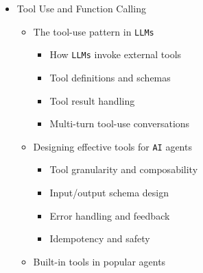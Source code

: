 \documentclass[
]{article}
\providecommand{\tightlist}{%
  \setlength{\itemsep}{0pt}\setlength{\parskip}{0pt}}
\begin{document}
\begin{itemize}
\begin{itemize}
    \begin{itemize}
    \tightlist
    \item
      Searching by pattern and semantic meaning
    \item
      Understanding call graphs and dependencies
    \item
      Tracing data flow across modules
    \end{itemize}
  \item
    Refactoring monoliths with \texttt{AI} assistance

    \begin{itemize}
    \tightlist
    \item
      Identifying extraction candidates
    \item
      Safe, incremental refactoring workflows
    \item
      Maintaining test coverage during refactoring
    \end{itemize}
  \item
    \texttt{AI}-assisted code archaeology

    \begin{itemize}
    \tightlist
    \item
      Understanding legacy code
    \item
      Documenting tribal knowledge
    \item
      Mapping undocumented APIs and protocols
    \end{itemize}
  \end{itemize}
\item
  Tool Use and Function Calling

  \begin{itemize}
  \tightlist
  \item
    The tool-use pattern in \texttt{LLMs}

    \begin{itemize}
    \tightlist
    \item
      How \texttt{LLMs} invoke external tools
    \item
      Tool definitions and schemas
    \item
      Tool result handling
    \item
      Multi-turn tool-use conversations
    \end{itemize}
  \item
    Designing effective tools for \texttt{AI} agents

    \begin{itemize}
    \tightlist
    \item
      Tool granularity and composability
    \item
      Input/output schema design
    \item
      Error handling and feedback
    \item
      Idempotency and safety
    \end{itemize}
  \item
    Built-in tools in popular agents


\end{itemize}
\end{itemize}
\end{document}
